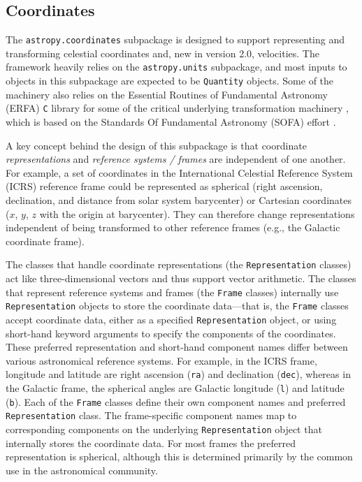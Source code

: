 \documentclass[modern]{aastex61}
\newcommand{\package}[1]{\texttt{#1}\xspace}
\begin{document}
\subsection{Coordinates}
\label{sec:coordinates}
The \package{astropy.coordinates} subpackage is designed to support representing
and transforming celestial coordinates and, new in version 2.0, velocities.
The framework heavily relies on the \package{astropy.units} subpackage, and most
inputs to objects in this subpackage are expected to be \texttt{Quantity}
objects.
Some of the machinery also relies on the Essential Routines of Fundamental
Astronomy (ERFA) \texttt{C} library for some of the critical underlying
transformation machinery \citep{erfa}, which is based on the Standards Of
Fundamental Astronomy (SOFA) effort \citep{sofa}.

A key concept behind the design of this subpackage is that coordinate
\textit{representations} and \textit{reference systems / frames} are independent
of one another.
For example, a set of coordinates in the International Celestial Reference
System (ICRS) reference frame could be represented as spherical (right
ascension, declination, and distance from solar system barycenter) or Cartesian
coordinates ($x$, $y$, $z$ with the origin at barycenter).
They can therefore change representations independent of being transformed to
other reference frames (e.g., the Galactic coordinate frame).

The classes that handle coordinate representations (the \texttt{Representation}
classes) act like three-dimensional vectors and thus support vector arithmetic.
The classes that represent reference systems and frames (the \texttt{Frame}
classes) internally use \texttt{Representation} objects to store the coordinate
data---that is, the \texttt{Frame} classes accept coordinate data, either as a
specified \texttt{Representation} object, or using short-hand keyword arguments
to specify the components of the coordinates.
These preferred representation and short-hand component names differ between
various astronomical reference systems.
For example, in the ICRS frame, longitude and latitude are right ascension
(\texttt{ra}) and declination (\texttt{dec}), whereas in the Galactic frame, the
spherical angles are Galactic longitude (\texttt{l}) and latitude (\texttt{b}).
Each of the \texttt{Frame} classes define their own component names and
preferred \texttt{Representation} class.
The frame-specific component names map to corresponding components on the
underlying \texttt{Representation} object that internally stores the coordinate
data.
For most frames the preferred representation is spherical, although this is
determined primarily by the common use in the astronomical community.
\end{document}
